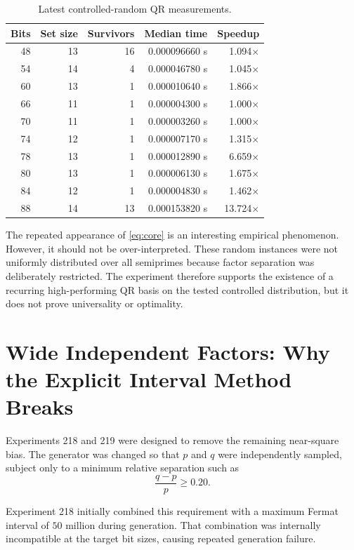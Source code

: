 \documentclass[11pt,a4paper]{article}
\begin{document}
\begin{table}[H]
\centering
\caption{Latest controlled-random QR measurements.}
\label{tab:random}
\begin{tabular}{rrrrr}
\toprule
Bits & Set size & Survivors & Median time & Speedup\\
\midrule
48 & 13 & 16 & 0.000096660 s & 1.094$\times$\\
54 & 14 & 4 & 0.000046780 s & 1.045$\times$\\
60 & 13 & 1 & 0.000010640 s & 1.866$\times$\\
66 & 11 & 1 & 0.000004300 s & 1.000$\times$\\
70 & 11 & 1 & 0.000003260 s & 1.000$\times$\\
74 & 12 & 1 & 0.000007170 s & 1.315$\times$\\
78 & 13 & 1 & 0.000012890 s & 6.659$\times$\\
80 & 13 & 1 & 0.000006130 s & 1.675$\times$\\
84 & 12 & 1 & 0.000004830 s & 1.462$\times$\\
88 & 14 & 13 & 0.000153820 s & 13.724$\times$\\
\bottomrule
\end{tabular}
\end{table}

The repeated appearance of \eqref{eq:core} is an interesting empirical phenomenon. However, it should not be over-interpreted. These random instances were not uniformly distributed over all semiprimes because factor separation was deliberately restricted. The experiment therefore supports the existence of a recurring high-performing QR basis on the tested controlled distribution, but it does not prove universality or optimality.

\section{Wide Independent Factors: Why the Explicit Interval Method Breaks}

Experiments 218 and 219 were designed to remove the remaining near-square bias. The generator was changed so that $p$ and $q$ were independently sampled, subject only to a minimum relative separation such as
\[
\frac{q-p}{p}\ge 0.20.
\]

Experiment 218 initially combined this requirement with a maximum Fermat interval of $50$ million during generation. That combination was internally incompatible at the target bit sizes, causing repeated generation failure.
\end{document}
